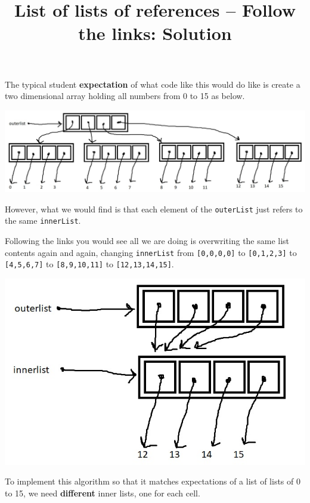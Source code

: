 \documentclass[a4paper,12pt]{article}
\title{List of lists of references -- Follow the links: Solution}
\author{}
\date{}
\begin{document}
\maketitle

The typical student \textbf{expectation} of what code like this would do like is create a two dimensional array holding all numbers from 0 to 15 as below.
\bigskip

\includegraphics[width=\linewidth]{solution-incorrect-student-expectation.jpg}
\vspace{1em}

However, what we would find is that each element of the \texttt{outerList} just refers to the same \texttt{innerList}.

Following the links you would see all we are doing is overwriting the same list contents again and again, changing \texttt{innerList} from \texttt{[0,0,0,0]} to \texttt{[0,1,2,3]} to \texttt{[4,5,6,7]} to \texttt{[8,9,10,11]} to \texttt{[12,13,14,15]}.

\includegraphics{solution-correct.jpg}\vspace{1em}

To implement this algorithm so that it matches expectations of a list of lists of 0 to 15, we need \textbf{different} inner lists, one for each cell.
\end{document}
